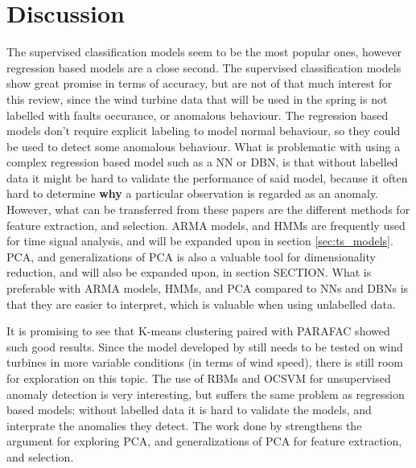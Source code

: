\section{Discussion}
The supervised classification models seem to be the most popular ones, however regression based models are a close second. The supervised classification models show great promise in terms of accuracy, but are not of that much interest for this review, since the wind turbine data that will be used in the spring is not labelled with faults occurance, or anomalous behaviour. The regression based models don't require explicit labeling to model normal behaviour, so they could be used to detect some anomalous behaviour. What is problematic with using a complex regression based model such as a NN or DBN, is that without labelled data it might be hard to validate the performance of said model, because it often hard to determine \textbf{why} a particular observation is regarded as an anomaly. However, what can be transferred from these papers are the different methods for feature extraction, and selection. ARMA models, and HMMs are frequently used for time signal analysis, and will be expanded upon in section \ref{sec:ts_models}. PCA, and generalizations of PCA is also a valuable tool for dimensionality reduction, and will also be expanded upon, in section SECTION. What is preferable with ARMA models, HMMs, and PCA compared to NNs and DBNs is that they are easier to interpret, which is valuable when using unlabelled data. \bigskip

It is promising to see that K-means clustering paired with PARAFAC showed such good results. Since the model developed by \textcite{fault_detect_PARAFAC_k_means} still needs to be tested on wind turbines in more variable conditions (in terms of wind speed), there is still room for exploration on this topic. The use of RBMs and OCSVM for unsupervised anomaly detection is very interesting, but suffers the same problem as regression based models: without labelled data it is hard to validate the models, and interprate the anomalies they detect. The work done by \textcite{multiway_PCA_multivar_inference_cm_wt} strengthens the argument for exploring PCA, and generalizations of PCA for feature extraction, and selection.